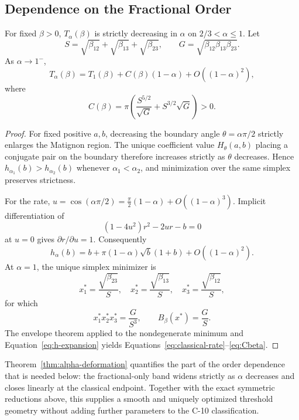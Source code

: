 \subsection{Dependence on the Fractional Order}

\begin{Theorem}\label{thm:alpha-deformation}
For fixed \(\beta>0\), \(T_\alpha(\beta)\) is strictly decreasing in \(\alpha\) on \(2/3<\alpha\le1\). Let
\[
 S=\sqrt{\beta_{12}}+\sqrt{\beta_{13}}+\sqrt{\beta_{23}},
 \qquad
 G=\sqrt{\beta_{12}\beta_{13}\beta_{23}}.
\]
As \(\alpha\to1^{-}\),
\begin{equation}
 T_\alpha(\beta)
 =
 T_1(\beta)
 +
 C(\beta)(1-\alpha)
 +
 O((1-\alpha)^2),
 \label{eq:classical-rate}
\end{equation}
where
\begin{equation}
 C(\beta)
 =
 \pi\left(
 \frac{S^{5/2}}{\sqrt G}
 +
 S^{3/2}\sqrt G
 \right)>0.
 \label{eq:Cbeta}
\end{equation}
\end{Theorem}

\begin{proof}
For fixed positive \(a,b\), decreasing the boundary angle \(\theta=\alpha\pi/2\) strictly enlarges the Matignon region. The unique coefficient value \(H_\theta(a,b)\) placing a conjugate pair on the boundary therefore increases strictly as \(\theta\) decreases. Hence \(h_{\alpha_1}(b)>h_{\alpha_2}(b)\) whenever \(\alpha_1<\alpha_2\), and minimization over the same simplex preserves strictness.

For the rate, \(u=\cos(\alpha\pi/2)=\frac{\pi}{2}(1-\alpha)+O((1-\alpha)^3)\). Implicit differentiation of
\[
 (1-4u^2)r^2-2ur-b=0
\]
at \(u=0\) gives \(\partial r/\partial u=1\). Consequently
\begin{equation}
 h_\alpha(b)
 =
 b+\pi(1-\alpha)\sqrt b(1+b)+O((1-\alpha)^2).
 \label{eq:h-expansion}
\end{equation}
At \(\alpha=1\), the unique simplex minimizer is
\[
 x_1^*=\frac{\sqrt{\beta_{23}}}{S},
 \quad
 x_2^*=\frac{\sqrt{\beta_{13}}}{S},
 \quad
 x_3^*=\frac{\sqrt{\beta_{12}}}{S},
\]
for which
\[
 x_1^*x_2^*x_3^*=\frac{G}{S^3},
 \qquad
 B_\beta(x^*)=\frac{G}{S}.
\]
The envelope theorem applied to the nondegenerate minimum and Equation~\eqref{eq:h-expansion} yields Equations~\eqref{eq:classical-rate}--\eqref{eq:Cbeta}.
\end{proof}

Theorem~\ref{thm:alpha-deformation} quantifies the part of the order dependence that is needed below: the fractional-only band widens strictly as \(\alpha\) decreases and closes linearly at the classical endpoint. Together with the exact symmetric reductions above, this supplies a smooth and uniquely optimized threshold geometry without adding further parameters to the C-10 classification.

